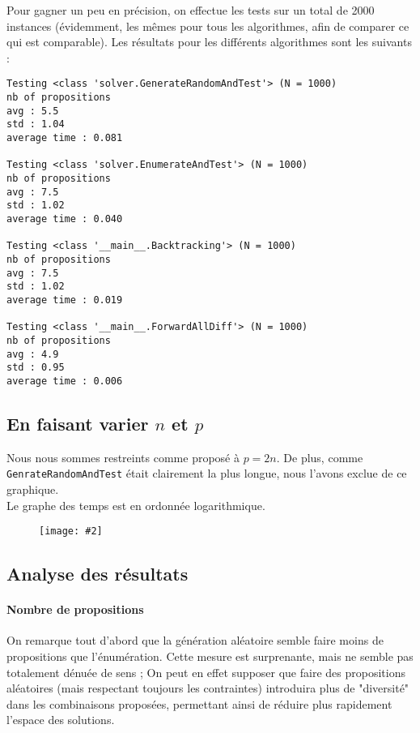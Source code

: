 \documentclass[a4paper, 12pt]{report}
\newcommand{\py}[1]{\texttt{#1}}
\newcommand{\cfigure}[3][6cm]{
	\begin{figure}[H]
		\centering
		\texttt{[image: \#2]}
		\caption{#3}
	\end{figure}
}
\begin{document}
Pour gagner un peu en précision, on effectue les tests sur un total de 2000 instances (évidemment, les mêmes pour tous les algorithmes, afin de comparer ce qui est comparable).
Les résultats pour les différents algorithmes sont les suivants :

\begin{verbatim}
Testing <class 'solver.GenerateRandomAndTest'> (N = 1000)
nb of propositions
avg : 5.5
std : 1.04
average time : 0.081

Testing <class 'solver.EnumerateAndTest'> (N = 1000)
nb of propositions
avg : 7.5
std : 1.02
average time : 0.040

Testing <class '__main__.Backtracking'> (N = 1000)
nb of propositions
avg : 7.5
std : 1.02
average time : 0.019

Testing <class '__main__.ForwardAllDiff'> (N = 1000)
nb of propositions
avg : 4.9
std : 0.95
average time : 0.006
\end{verbatim}

\subsection*{En faisant varier $n$ et $p$}

Nous nous sommes restreints comme proposé à $p = 2n$. De plus, comme \py{GenrateRandomAndTest} était clairement la plus longue, nous l'avons exclue de ce graphique. \\

Le graphe des temps est en ordonnée logarithmique.

\cfigure[7cm]{Figure_4.png}{}

\subsection*{Analyse des résultats}

\paragraph*{Nombre de propositions}

On remarque tout d'abord que la génération aléatoire semble faire moins de propositions que l'énumération. Cette mesure est surprenante, mais ne semble pas totalement dénuée de sens ; On peut en effet supposer que faire des propositions aléatoires (mais respectant toujours les contraintes) introduira plus de "diversité" dans les combinaisons proposées, permettant ainsi de réduire plus rapidement l'espace des solutions. \\
\end{document}
